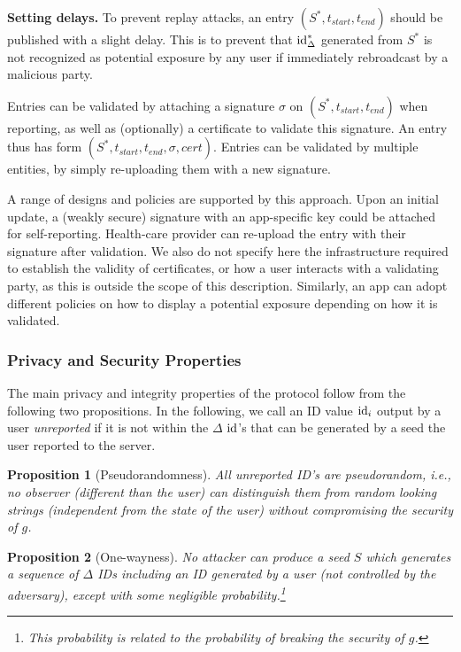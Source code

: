 \documentclass{article}
\newtheorem{proposition}{Proposition}
\begin{document}
{\bf Setting delays.} To prevent replay attacks, an entry $(S^*,t_{start}, t_{end})$ should be published with a slight delay. This is to prevent that $\mathrm{id}^*_{\Delta}$ generated from $S^*$ is not recognized as potential exposure by any user if immediately rebroadcast by a malicious party.


 Entries can be validated by attaching a signature $\sigma$ on $(S^*, t_{start}, t_{end})$ when reporting, as well as (optionally) a certificate to validate this signature. An entry thus has form $(S^*, t_{start}, t_{end}, \sigma, cert)$. Entries can be validated by multiple entities, by simply re-uploading them with a new signature.

A range of designs and policies are supported by this approach. Upon an initial update, a (weakly secure) signature with an app-specific key could be attached for self-reporting. Health-care provider can re-upload the entry with their signature after validation. We also do not specify here the infrastructure required to establish the validity of certificates, or how a user interacts with a validating party, as this is outside the scope of this description. Similarly, an app can adopt different policies on how to display a potential exposure depending on how it is validated.

\subsubsection{Privacy and Security Properties}

The main privacy and integrity properties of the protocol follow from the following two propositions. In the following, we call an ID value $\mathrm{id}_i$ output by a user {\em unreported} if it is not within the $\Delta$ $\mathrm{id}$'s that can be generated by a seed the user reported to the server. 

\begin{proposition}[Pseudorandomness]
   All unreported ID's are pseudorandom, i.e., no observer (different than the user) can distinguish them from random looking strings (independent from the state of the user) without compromising the security of $g$.
\end{proposition}

\begin{proposition}[One-wayness]
   No attacker can produce a seed $S$ which generates a sequence of $\Delta$ IDs including an ID generated by a user (not controlled by the adversary), except with some negligible probability.\footnote{This probability is related to the probability of breaking the security of $g$.}
\end{proposition}
\end{document}
